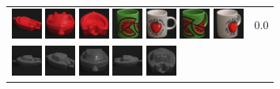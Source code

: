 \begin{figure}[tbp]
\begin{center}
\begin{tabular}{m{11cm} | m{3cm} |}
\includegraphics[width=1cm]{coil/beeld-22.eps}
\includegraphics[width=1cm]{coil/beeld-20.eps}
\includegraphics[width=1cm]{coil/beeld-23.eps}
\includegraphics[width=1cm]{coil/beeld-32.eps}
\includegraphics[width=1cm]{coil/beeld-36.eps}
\includegraphics[width=1cm]{coil/beeld-33.eps}
\includegraphics[width=1cm]{coil/beeld-39.eps}
& {\scriptsize 0.0}
\\
\includegraphics[width=1cm]{coil/beeld-24.eps}
\includegraphics[width=1cm]{coil/beeld-25.eps}
\includegraphics[width=1cm]{coil/beeld-28.eps}
\includegraphics[width=1cm]{coil/beeld-27.eps}
\includegraphics[width=1cm]{coil/beeld-26.eps}

\end{tabular}
\end{center}
\end{figure}
